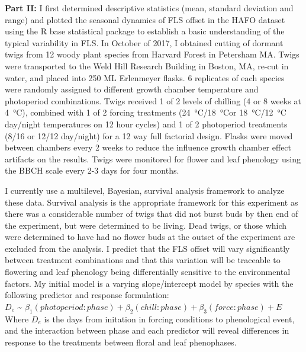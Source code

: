 \documentclass{article}\usepackage[]{graphicx}\usepackage[]{color}
\begin{document}
\indent\textbf{Part II:} I first determined descriptive statistics (mean, standard deviation and range) and plotted the seasonal dynamics of FLS offset in the HAFO dataset using the R base statistical package to establish a basic understanding of the typical variability in FLS. In October of 2017, I obtained cutting of dormant twigs from 12 woody plant species from Harvard Forest in Petersham MA. Twigs were transported to the Weld Hill Research Building in Boston, MA, re-cut in water, and placed into 250 ML Erlenmeyer flasks. 6 replicates of each species were randomly assigned to different growth chamber temperature and photoperiod combinations. Twigs received 1 of 2 levels of chilling (4 or 8 weeks at \SI{4}{\degreeCelsius}), combined with 1 of 2 forcing treatments (\SI{24}{\degreeCelsius}/\SI{18}{\degreeCelsius}or \SI{18}{\degreeCelsius}/\SI{12}{\degreeCelsius} day/night temperatures on 12 hour cycles) and 1 of 2 photoperiod treatments (8/16 or 12/12 day/night) for a 12 way full factorial design. Flasks were moved between chambers every 2 weeks to reduce the influence growth chamber effect artifacts on the results. Twigs were monitored for flower and leaf phenology using the BBCH scale \citep{Finn2007} every 2-3 days for four months.
\par I currently  use a multilevel, Bayesian, survival analysis framework to analyze these data. Survival analysis is the appropriate framework for this experiment as there was a considerable number of twigs that did not burst buds by then end of the experiment, but were determined to be living. Dead twigs, or those which were determined to have had no flower buds at the outset of the experiment are excluded from the analysis. I predict that the FLS offset will vary significantly between treatment combinations and that this variation will be traceable to flowering and leaf phenology being differentially sensitive to the environmental factors. My initial model is a varying slope/intercept model by species with the following predictor and response formulation:\\
\indent$D_e$ \~{} $\beta_1(photoperiod:phase)+\beta_2(chill:phase)+\beta_3 (force:phase)+E $\\
Where $D_e$ is the days from initation in forcing conditions to phenological event, and the interaction between phase and each predictor will reveal differences in response to the treatments between floral and leaf phenophases.
\end{document}
